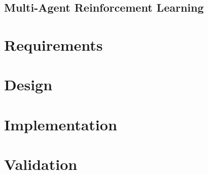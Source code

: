 \documentclass[12pt,a4paper,openright,twoside]{book}
\begin{document}
\section{Multi-Agent Reinforcement Learning}

\chapter{Requirements} 
\label{chap:requirements}


\chapter{Design} 
\label{chap:design}


\chapter{Implementation} 
\label{chap:implementation}


\chapter{Validation} %
\label{chap:validation}


\chapter{\conclusionsname}
\label{chap:conclusions}





\end{document}
